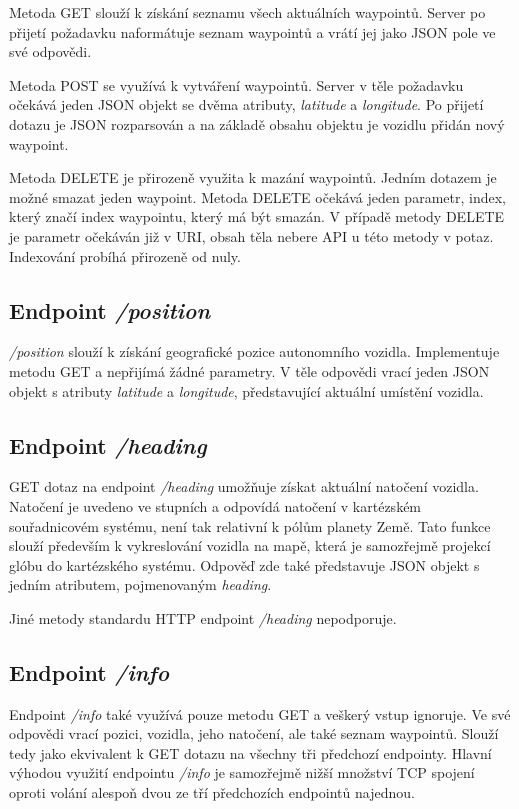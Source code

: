 \documentclass[czech, bachelor]{diploma}
\begin{document}
Metoda GET slouží k získání seznamu všech aktuálních waypointů. Server po přijetí požadavku naformátuje seznam waypointů a vrátí
jej jako JSON pole ve své odpovědi.

Metoda POST se využívá k vytváření waypointů. Server v těle požadavku očekává jeden JSON objekt se dvěma atributy, \emph{latitude}
a \emph{longitude}. Po přijetí dotazu je JSON rozparsován a na základě obsahu objektu je vozidlu přidán nový waypoint.

Metoda DELETE je přirozeně využita k mazání waypointů. Jedním dotazem je možné smazat jeden waypoint. Metoda DELETE očekává jeden
parametr, index, který značí index waypointu, který má být smazán. V případě metody DELETE je parametr očekáván již v URI, obsah
těla nebere API u této metody v potaz. Indexování probíhá přirozeně od nuly.

\subsection{Endpoint \emph{/position}}

\emph{/position} slouží k získání geografické pozice autonomního vozidla. Implementuje metodu GET a nepřijímá žádné parametry.
V těle odpovědi vrací jeden JSON objekt s atributy \emph{latitude} a \emph{longitude}, představující aktuální umístění vozidla.

\subsection{Endpoint \emph{/heading}}

GET dotaz na endpoint \emph{/heading} umožňuje získat aktuální natočení vozidla. Natočení je uvedeno ve stupních a odpovídá
natočení v kartézském souřadnicovém systému, není tak relativní k pólům planety Země. Tato funkce slouží především k vykreslování
vozidla na mapě, která je samozřejmě projekcí glóbu do kartézského systému. Odpověď zde také představuje JSON objekt s jedním
atributem, pojmenovaným \emph{heading}.

Jiné metody standardu HTTP endpoint \emph{/heading} nepodporuje.

\subsection{Endpoint \emph{/info}}

Endpoint \emph{/info} také využívá pouze metodu GET a veškerý vstup ignoruje. Ve své odpovědi vrací pozici, vozidla, jeho
natočení, ale také seznam waypointů. Slouží tedy jako ekvivalent k GET dotazu na všechny tři předchozí endpointy. Hlavní výhodou
využití endpointu \emph{/info} je samozřejmě nižší množství TCP spojení oproti volání alespoň dvou ze tří předchozích endpointů
najednou.
\end{document}

